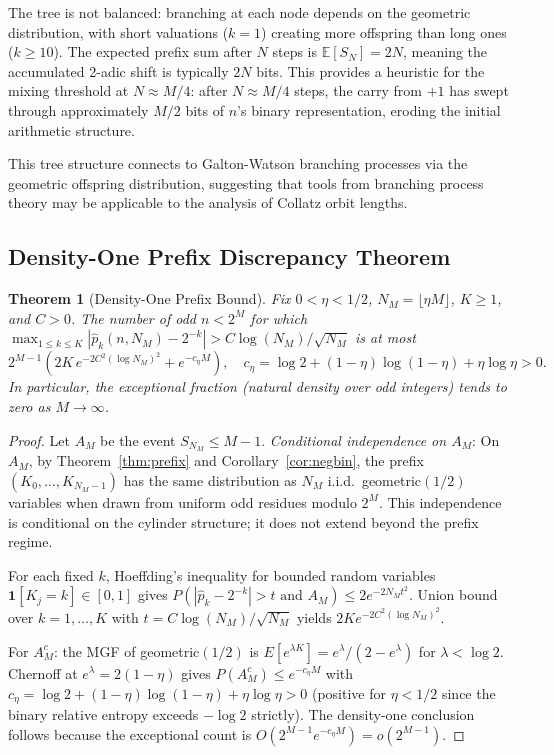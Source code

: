 \documentclass[12pt]{article}
\newtheorem{theorem}{Theorem}
\theoremstyle{definition}
\theoremstyle{remark}
\begin{document}
The tree is not balanced: branching at each node depends on the
geometric distribution, with short valuations ($k=1$) creating more
offspring than long ones ($k\geq 10$).
The expected prefix sum after $N$ steps is $\mathbb{E}[S_N]=2N$,
meaning the accumulated 2-adic shift is typically $2N$ bits.
This provides a heuristic for the mixing threshold at $N\approx M/4$:
after $N\approx M/4$ steps, the carry from $+1$ has swept through
approximately $M/2$ bits of $n$'s binary representation,
eroding the initial arithmetic structure.

This tree structure connects to Galton-Watson branching processes
via the geometric offspring distribution, suggesting that tools from
branching process theory may be applicable to the analysis of
Collatz orbit lengths.

\subsection{Density-One Prefix Discrepancy Theorem}

\begin{theorem}[Density-One Prefix Bound]\label{thm:density}
Fix $0<\eta<1/2$, $N_M=\lfloor\eta M\rfloor$, $K\geq 1$, and $C>0$.
The number of odd $n<2^M$ for which
$\max_{1\leq k\leq K}|\hat{p}_k(n,N_M)-2^{-k}|>C\log(N_M)/\sqrt{N_M}$
is at most
\[
2^{M-1}\!\left(2K\,e^{-2C^2(\log N_M)^2}+e^{-c_\eta M}\right),\quad
c_\eta=\log 2+(1-\eta)\log(1-\eta)+\eta\log\eta>0.
\]
In particular, the exceptional fraction (natural density over odd integers)
tends to zero as $M\to\infty$.
\end{theorem}

\begin{proof}
Let $A_M$ be the event $S_{N_M}\leq M-1$.
\emph{Conditional independence on $A_M$}:
On $A_M$, by Theorem~\ref{thm:prefix} and Corollary~\ref{cor:negbin},
the prefix $(K_0,\ldots,K_{N_M-1})$ has the same distribution as
$N_M$ i.i.d.\ geometric$(1/2)$ variables when drawn from uniform odd
residues modulo $2^M$.
This independence is conditional on the cylinder structure;
it does not extend beyond the prefix regime.

For each fixed $k$, Hoeffding's inequality for bounded random variables
$\mathbf{1}[K_j=k]\in[0,1]$ gives
$P(|\hat{p}_k-2^{-k}|>t\text{ and }A_M)\leq 2e^{-2N_Mt^2}$.
Union bound over $k=1,\ldots,K$ with $t=C\log(N_M)/\sqrt{N_M}$
yields $2Ke^{-2C^2(\log N_M)^2}$.

For $A_M^c$: the MGF of geometric$(1/2)$ is
$E[e^{\lambda K}]=e^\lambda/(2-e^\lambda)$ for $\lambda<\log 2$.
Chernoff at $e^\lambda=2(1-\eta)$ gives $P(A_M^c)\leq e^{-c_\eta M}$
with $c_\eta=\log 2+(1-\eta)\log(1-\eta)+\eta\log\eta>0$
(positive for $\eta<1/2$ since the binary relative entropy exceeds
$-\log 2$ strictly).
The density-one conclusion follows because the exceptional count is
$O(2^{M-1}e^{-c_\eta M})=o(2^{M-1})$.
\end{proof}
\end{document}
